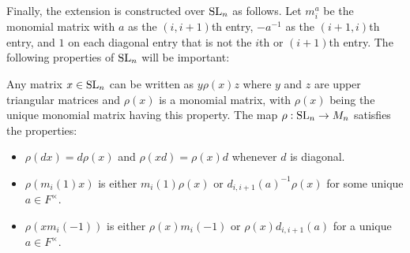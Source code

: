 Finally, the extension is constructed over $\mathrm{SL}_n$ as follows. Let $m_i^a$ be the monomial matrix with $a$ as the $(i, i + 1)$th entry, $-a^{-1}$ as the $(i + 1, i)$th entry, and $1$ on each diagonal entry that is not the $i$th or $(i + 1)$th entry. The following properties of $\mathrm{SL}_n$ will be important:
\begin{lemma}
    Any matrix $x \in \mathrm{SL}_n$ can be written as $y\rho(x)z$ where $y$ and $z$ are upper triangular matrices and $\rho(x)$ is a monomial matrix, with $\rho(x)$ being the unique monomial matrix having this property. The map $\rho : \mathrm{SL}_n \to M_n$ satisfies the properties:
    \begin{itemize}
        \item $\rho(dx) = d\rho(x)$ and $\rho(xd) = \rho(x)d$ whenever $d$ is diagonal.
        \item $\rho(m_i(1)x)$ is either $m_i(1)\rho(x)$ or $d_{i, i+1}(a)^{-1}\rho(x)$ for some unique $a \in F^\times$.
        \item $\rho(xm_i(-1))$ is either $\rho(x)m_i(-1)$ or $\rho(x)d_{i, i +1}(a)$ for a unique $a \in F^\times$.
    \end{itemize}
\end{lemma}

